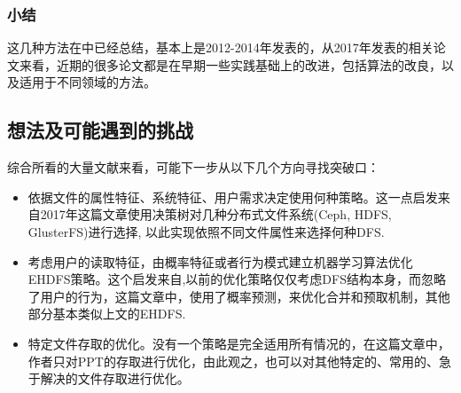 \documentclass[UTF8]{ctexart}
\begin{document}
\subsubsection{小结}
这几种方法在\cite{Sachin}中已经总结，基本上是2012-2014年发表的，从2017年发表的相关论文来看，近期的很多论文都是在早期一些实践基础上的改进，包括算法的改良，以及适用于不同领域的方法。

\subsection{想法及可能遇到的挑战}
综合所看的大量文献来看，可能下一步从以下几个方向寻找突破口：

\begin{itemize}
\item 依据文件的属性特征、系统特征、用户需求决定使用何种策略。这一点启发来自2017年这篇文章\cite{Lidong}使用决策树对几种分布式文件系统(Ceph, HDFS, GlusterFS)进行选择, 以此实现依照不同文件属性来选择何种DFS. 
\item 考虑用户的读取特征，由概率特征或者行为模式建立机器学习算法优化EHDFS策略。这个启发来自\cite{TaoW},以前的优化策略仅仅考虑DFS结构本身，而忽略了用户的行为，这篇文章中，使用了概率预测，来优化合并和预取机制，其他部分基本类似上文的EHDFS.
\item 特定文件存取的优化。没有一个策略是完全适用所有情况的，在这篇\cite{DongB}文章中，作者只对PPT的存取进行优化，由此观之，也可以对其他特定的、常用的、急于解决的文件存取进行优化。
\end{itemize}
\end{document}
